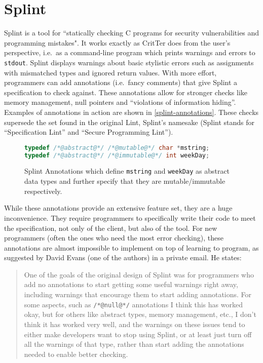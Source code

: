 \documentclass[12pt]{report}
\newcommand{\programName}{CritTer\xspace}
\begin{document}
\section{Splint}
\label{sec:splint}

Splint is a tool for ``statically checking C programs for security vulnerabilities and programming 
mistakes"\cite[p.\ 9]{splint-manual}. It works exactly as \programName does from the user's
perspective, i.e.\ as a command-line program which prints warnings and errors to \lstinline{stdout}. 
Splint displays warnings about basic stylistic errors such as assignments with mismatched types and 
ignored return values. With more effort, programmers can add annotations (i.e.\ fancy comments) that 
give Splint a specification to check against. These annotations allow for stronger checks like memory 
management, null pointers and ``violations of information hiding''\cite[p. 9]{splint-manual}. 
Examples of annotations in action are shown in \autoref{splint-annotations}. These checks supersede 
the set found in the original Lint, Splint's namesake (Splint stands for ``Specification Lint'' and ``Secure 
Programming Lint''). 

\begin{figure}
\begin{lstlisting}[frame=single, language=C]
typedef /*@abstract@*/ /*@mutable@*/ char *mstring;
typedef /*@abstract@*/ /*@immutable@*/ int weekDay;
\end{lstlisting}
\caption[Splint Annotations]{Splint Annotations which define \lstinline{mstring} and \lstinline{weekDay} as abstract data types and further specify that they are mutable\slash immutable respectively.} 
\label{splint-annotations}
\end{figure}

While these annotations provide an extensive feature set, they are a huge inconvenience. They 
require programmers to specifically write their code to meet the specification, not only of the client, but 
also of the tool. For new programmers (often the ones who need the most error checking), these 
annotations are almost impossible to implement on top of learning to program, as suggested by  
David Evans (one of the authors) in a private email. He states:
\begin{quote} \singlespacing
One of the goals of the original design of Splint was for programmers who add no annotations to start 
getting some useful warnings right away, including warnings that encourage them to start adding 
annotations.  For some aspects, such as \lstinline{/*@null@*/} annotations I think this has worked okay, 
but for others like abstract types, memory management, etc., I don't think it has worked very well, and the 
warnings on these issues tend to either make developers want to stop using Splint, or at least just turn off 
all the warnings of that type, rather than start adding the annotations needed to enable better 
checking.\cite{evans-email} 
\end{quote}
\end{document}
